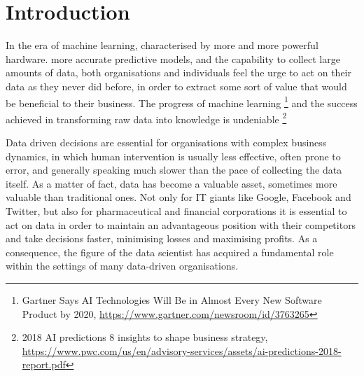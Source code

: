 \documentclass[12pt, a4paper,titlepage]{extreport}
\begin{document}
\section{Introduction}



In the era of machine learning, characterised by more and more powerful hardware. more accurate predictive models, and the capability to collect large amounts of data, both organisations and individuals feel the urge to act on their data as they never did before, in order to extract some sort of value that would be beneficial to their business. The progress of machine learning \footnote{Gartner Says AI Technologies Will Be in Almost Every New Software Product by 2020, \url{https://www.gartner.com/newsroom/id/3763265}} and the success achieved in transforming raw data into knowledge is undeniable \footnote{2018 AI predictions 8 insights to shape business strategy, \url{https://www.pwc.com/us/en/advisory-services/assets/ai-predictions-2018-report.pdf} } 


Data driven decisions are essential for organisations with complex business dynamics, in which human intervention is usually less effective, often prone to error, and generally speaking much slower than the pace of collecting the data itself. As a matter of fact, data has become a valuable asset, sometimes more valuable than traditional ones. Not only for IT giants like Google, Facebook and Twitter, but also for pharmaceutical and financial corporations it is essential to act on data in order to maintain an advantageous position with their competitors and take decisions faster, minimising losses and maximising profits. As a consequence, the figure of the data scientist has acquired a fundamental role within the settings of many data-driven organisations.
\end{document}
